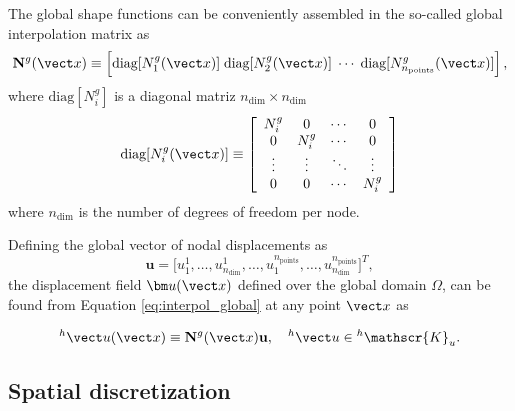 The global shape functions can be conveniently assembled in the so-called global interpolation matrix as
\begin{equation}
    \mathbf N^g(\vect x) \equiv \left[\text{diag}[N_1^g(\vect x)]\; \text{diag}[N_2^g(\vect x)]\;\cdots\; \text{diag}[N_{n_\text{points}}^g(\vect x)]\right],
\end{equation}
where $\text{diag}[N_i^g]$ is a diagonal matriz $n_\text{dim} \times n_\text{dim}$
\begin{equation}
    \text{diag}[N_i^g(\vect x)]\equiv \left[
    \begin{array}{cccc}
         N_i^g & 0 & \cdots & 0  \\
         0     & N_i^g & \cdots & 0 \\
         \vdots & \vdots & \ddots & \vdots \\
         0 & 0 & \cdots & N_i^g
    \end{array}
    \right]
\end{equation}
where $n_\text{dim}$ is the number of degrees of freedom per node.

Defining the global vector of nodal displacements as
\begin{equation}
    \mathbf u = \Big[ u_1^1,\dots,u^1_{n_\text{dim}},\dots, u_1^{n_\text{points}},\dots,u^{n_\text{points}}_{n_\text{dim}}\Big]^T,
\end{equation}
the displacement field $\bm u(\vect x)$ defined over the global domain $\Omega$, can be found from Equation \eqref{eq:interpol_global} at any point $\vect x$ as
\begin{highlight}
    \begin{equation}
        ^h\vect u(\vect x) \equiv \mathbf N^g(\vect x)\mathbf u,\quad {}^h\vect u\in {}^h\mathscr{K}_u.
    \end{equation}
\end{highlight}

\subsection{Spatial discretization} \label{sec:spatial_discretization_mech}

